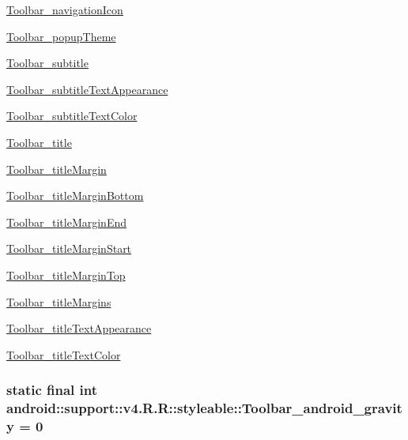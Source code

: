 \begin{Desc}
\hyperlink{classandroid_1_1support_1_1v4_1_1_r_1_1styleable_91d5fad8e57cec704e2157d1f6a7b331}{Toolbar\_\-navigationIcon} 

\hyperlink{classandroid_1_1support_1_1v4_1_1_r_1_1styleable_988c9145b755a926e12ec19da469cd62}{Toolbar\_\-popupTheme} 

\hyperlink{classandroid_1_1support_1_1v4_1_1_r_1_1styleable_477282d30e4e1d001d974339d5a3612e}{Toolbar\_\-subtitle} 

\hyperlink{classandroid_1_1support_1_1v4_1_1_r_1_1styleable_591a12ae0a18148eb5e6102631e7a595}{Toolbar\_\-subtitleTextAppearance} 

\hyperlink{classandroid_1_1support_1_1v4_1_1_r_1_1styleable_6aafb77e85baad2d0ed9e1879c82cf10}{Toolbar\_\-subtitleTextColor} 

\hyperlink{classandroid_1_1support_1_1v4_1_1_r_1_1styleable_b046a72644d4b4e207982a1e5afea260}{Toolbar\_\-title} 

\hyperlink{classandroid_1_1support_1_1v4_1_1_r_1_1styleable_4b5c6289c4f1411b5ea97486e152a575}{Toolbar\_\-titleMargin} 

\hyperlink{classandroid_1_1support_1_1v4_1_1_r_1_1styleable_433a3c5c0de8d666a83b66f953bf878b}{Toolbar\_\-titleMarginBottom} 

\hyperlink{classandroid_1_1support_1_1v4_1_1_r_1_1styleable_ebea2a680be1013dc5ca88339b9360c2}{Toolbar\_\-titleMarginEnd} 

\hyperlink{classandroid_1_1support_1_1v4_1_1_r_1_1styleable_037398ad6eb4fa7d2271f386c71d7350}{Toolbar\_\-titleMarginStart} 

\hyperlink{classandroid_1_1support_1_1v4_1_1_r_1_1styleable_1a1bd2c6b7f34b8a59f7763da63777e2}{Toolbar\_\-titleMarginTop} 

\hyperlink{classandroid_1_1support_1_1v4_1_1_r_1_1styleable_4cf3f31b90bbd9298763173e8ae75087}{Toolbar\_\-titleMargins} 

\hyperlink{classandroid_1_1support_1_1v4_1_1_r_1_1styleable_bced41bbc6326ea8b574802f6d167432}{Toolbar\_\-titleTextAppearance} 

\hyperlink{classandroid_1_1support_1_1v4_1_1_r_1_1styleable_16f85315e8a126339f05a6869996771b}{Toolbar\_\-titleTextColor} \end{Desc}
\hypertarget{classandroid_1_1support_1_1v4_1_1_r_1_1styleable_c8fd7f49fc578cf34e84a402ac885942}{
\subsubsection[{Toolbar\_\-android\_\-gravity}]{\setlength{\rightskip}{0pt plus 5cm}static final int android::support::v4.R.R::styleable::Toolbar\_\-android\_\-gravity = 0}}
\label{classandroid_1_1support_1_1v4_1_1_r_1_1styleable_c8fd7f49fc578cf34e84a402ac885942}


